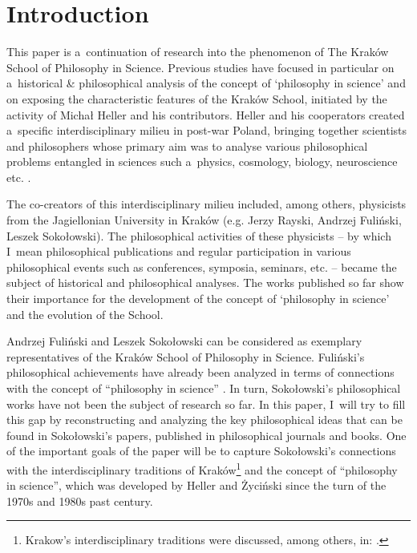 \section{Introduction}

This paper is a~continuation of research into the phenomenon of The Kraków School of Philosophy in Science. Previous studies 
\parencites[][p.226]{Trombik2021Koncepcje}[][]{Polak2022Krakow}[][]{Trombik2023Andrzej} %
 have focused in particular on a~historical \& philosophical analysis of the concept of ‘philosophy in science' and on exposing the characteristic features of the Kraków School, initiated by the activity of Michał Heller and his contributors. Heller and his cooperators created a~specific interdisciplinary milieu in post-war Poland, bringing together scientists and philosophers whose primary aim was to analyse various philosophical problems entangled in sciences such a~physics, cosmology, biology, neuroscience etc. 
\parencites[][]{Trombik2019origin}[][]{Polak2019Philosophy}.%




The co-creators of this interdisciplinary milieu included, among others, physicists from the Jagiellonian University in Kraków (e.g. Jerzy Rayski, Andrzej Fuliński, Leszek Sokołowski). The philosophical activities of these physicists -- by which I~mean philosophical publications and regular participation in various philosophical events such as conferences, symposia, seminars, etc. -- became the subject of historical and philosophical analyses. The works published so far show their importance for the development of the concept of ‘philosophy in science' and the evolution of the School.



Andrzej Fuliński and Leszek Sokołowski can be considered as exemplary representatives of the Kraków School of Philosophy in Science. Fuliński's philosophical achievements have already been analyzed in terms of connections with the concept of ``philosophy in science'' 
\parencite[][]{Trombik2023Andrzej}. %
 In turn, Sokołowski's philosophical works have not been the subject of research so far. In this paper, I~will try to fill this gap by reconstructing and analyzing the key philosophical ideas that can be found in Sokołowski's papers, published in philosophical journals and books. One of the important goals of the paper will be to capture Sokołowski's connections with the interdisciplinary traditions of Kraków\footnote{Krakow's interdisciplinary traditions were discussed, among others, in: 
\parencites[][]{Polak201119th}[][]{Polak2018Tradycja}.%
} and the concept of ``philosophy in science'', which was developed by Heller and Życiński since the turn of the 1970s and 1980s past century.



